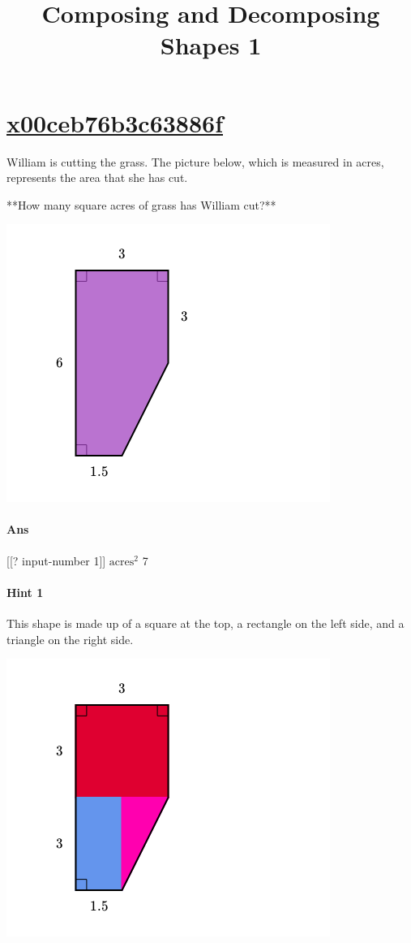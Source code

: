 \documentclass[twocolumn,10pt]{article}
\title{Composing and Decomposing Shapes 1}
\def\shrinkfactor{0.55}
\begin{document}
\maketitle



\section{\href{https://www.khanacademy.org/devadmin/content/items/x00ceb76b3c63886f}{x00ceb76b3c63886f}}

\noindent
William is cutting the grass.  The picture below, which is measured in acres, represents the area that she has cut.    

**How many square acres of grass has William cut?**  


\includegraphics[scale=\shrinkfactor]{figures/151cda9731a44833829ae8798b9679400b8e39bd.png}

\paragraph{Ans}  [[? input-number 1]] $\text{acres}^2$  7

\paragraph{Hint 1}This shape is made up of a square at the top, a rectangle on the left side, and a triangle on the right side.    


\includegraphics[scale=\shrinkfactor]{figures/302942f7714d41d6f87fcf9150ccaf8be7c6b3f0.png}   
 
\end{document}
